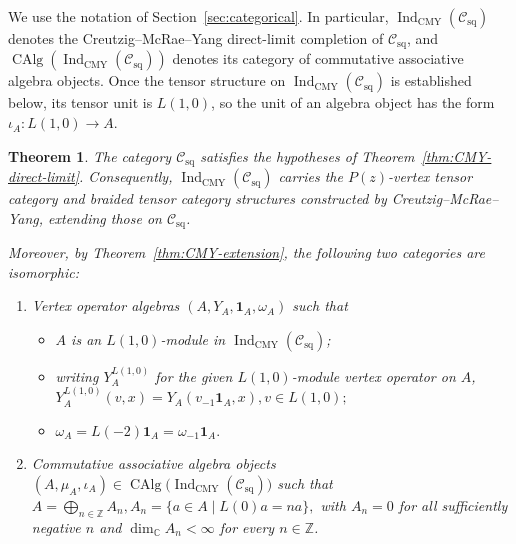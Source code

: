 \documentclass[10pt,a4paper]{amsart}
\numberwithin{equation}{section} \newtheorem{thm}{Theorem}[section] \newtheorem{lem}[thm]{Lemma} \newtheorem{ex}[thm]{Example} \newtheorem{prop}[thm]{Proposition} \newtheorem{cor}[thm]{Corollary} \newtheorem{defi}[thm]{Definition} \newtheorem{rmk}[thm]{Remark} \newtheorem{notation}[thm]{Notation}
\newcommand{\one}{\mathbf{1}}
\newcommand{\Csq}{\mathcal C_{\mathrm{sq}}}
\newcommand{\CAlg}{\operatorname{CAlg}}
\newcommand{\IndCMY}{\operatorname{Ind}_{\mathrm{CMY}}}
\def\Z{\mathbb{Z}} \def\N{\mathbb{N}} \def\A{\mathbb{A}} \def\C{\mathbb{C}} \def\R{\mathbb{R}} \def\Q{\mathbb{Q}} \def\F{\mathbb{F}}
\begin{document}
We use the notation of Section~\ref{sec:categorical}. In particular, $\IndCMY(\Csq)$ denotes the Creutzig--McRae--Yang direct-limit completion of $\Csq$, and $\CAlg(\IndCMY(\Csq))$ denotes its category of commutative associative algebra objects. Once the tensor structure on $\IndCMY(\Csq)$ is established below, its tensor unit is $L(1,0)$, so the unit of an algebra object has the form \(\iota_A:L(1,0)\longrightarrow A\).

\begin{thm}\label{thm:CMY-square}
The category $\Csq$ satisfies the hypotheses of Theorem~\ref{thm:CMY-direct-limit}. Consequently, $\IndCMY(\Csq)$ carries the $P(z)$-vertex tensor category and braided tensor category structures constructed by Creutzig--McRae--Yang, extending those on $\Csq$.

Moreover, by Theorem~\ref{thm:CMY-extension}, the following two categories are isomorphic:
\begin{enumerate}[label=\textnormal{(\arabic*)}]
\item Vertex operator algebras $(A,Y_A,\one_A,\omega_A)$ such that
\begin{itemize}
\item $A$ is an $L(1,0)$-module in $\IndCMY(\Csq)$;
\item writing $Y_A^{L(1,0)}$ for the given $L(1,0)$-module vertex
operator on $A$, \(Y_A^{L(1,0)}(v,x)=Y_A(v_{-1}\one_A,x),v\in L(1,0);\)
\item \(\omega_A=L(-2)\one_A=\omega_{-1}\one_A.\)
\end{itemize}

\item Commutative associative algebra objects \((A,\mu_A,\iota_A)\in\CAlg\bigl(\IndCMY(\Csq)\bigr)\)
such that \(A=\bigoplus_{n\in\Z}A_n,A_n=\{a\in A\mid L(0)a=na\},\) with $A_n=0$ for all sufficiently negative $n$ and $\dim_{\C}A_n<\infty$ for every $n\in\Z$.
\end{enumerate}
\end{thm}
\end{document}
